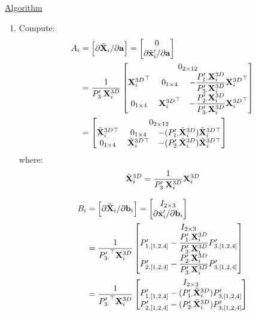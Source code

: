 \underline{Algorithm}
\renewcommand{\labelenumi}{(\roman{enumi})}
\begin{enumerate}
 \item Compute:
  \begin{align}
  \nonumber
  A_i &= \left[ \partial \bfXhat_i / \partial \bfa \right] =
 \begin{bmatrix} 0 \\ \partial \bfxhatp_i / \partial \bfa \end{bmatrix}\\
 &= \frac{1}{\Prow{3} \bfXDi}
 \begin{bmatrix} \multicolumn{3}{c}{\zero{2}{12}} \\ 
 \bfXDi^\top & \zero{1}{4} & -   \dfrac{\Prow{1} \bfXDi}{\Prow{3} \bfXDi} \bfXDi^\top \\
 \zero{1}{4} & \bfXDi^\top & -   \dfrac{\Prow{2} \bfXDi}{\Prow{3} \bfXDi} \bfXDi^\top \end{bmatrix}\\
 &= \begin{bmatrix} \multicolumn{3}{c}{\zero{2}{12}} \\
 \bfXDit^\top & \zero{1}{4} & -(\Prow{1} \bfXDit) \bfXDit^\top \\
 \zero{1}{4} & \bfXDit^\top & -(\Prow{2} \bfXDit) \bfXDit^\top \end{bmatrix}
 \end{align}
where: $${\tilde{\mathbf{X}}^{3D}_i}{}=\dfrac{1}{{P'_{3 \cdot}} {\mathbf{X}^{3D}_i}}{\mathbf{X}^{3D}_i}$$


 \begin{align}
  \nonumber
  B_i &= \left[ \partial \hat{\mathbf{X}}_i / \partial \mathbf{b}_i \right] =
 \begin{bmatrix} {I_{2 \times 3}} \\ \partial {\hat{\mathbf{x}}'}_i / \partial \mathbf{b}_i \end{bmatrix}\\
 &= \frac{1}{{P'_{3 \cdot}}^\top {\mathbf{X}^{3D}_i}}
 \begin{bmatrix} {I_{2 \times 3}} \\
  {P'_{{1},{[1,2,4]}}}  - \dfrac{{P'_{1 \cdot}} {\mathbf{X}^{3D}_i}}{{P'_{3 \cdot}} {\mathbf{X}^{3D}_i}} {P'_{{3},{[1,2,4]}}} \\
  {P'_{{2},{[1,2,4]}}}  - \dfrac{{P'_{2 \cdot}} {\mathbf{X}^{3D}_i}}{{P'_{3 \cdot}} {\mathbf{X}^{3D}_i}} {P'_{{3},{[1,2,4]}}} 
 \end{bmatrix}\\
 &= \frac{1}{{P'_{3 \cdot}}^\top {\mathbf{X}^{3D}_i}}
 \begin{bmatrix} {I_{2 \times 3}} \\
  {P'_{{1},{[1,2,4]}}}  - ({P'_{1 \cdot}} {\tilde{\mathbf{X}}^{3D}_i}{}) {P'_{{3},{[1,2,4]}}} \\
  {P'_{{2},{[1,2,4]}}}  - ({P'_{2 \cdot}} {\tilde{\mathbf{X}}^{3D}_i}{}) {P'_{{3},{[1,2,4]}}} 
 \end{bmatrix}
 \end{align}\\


\end{enumerate}
